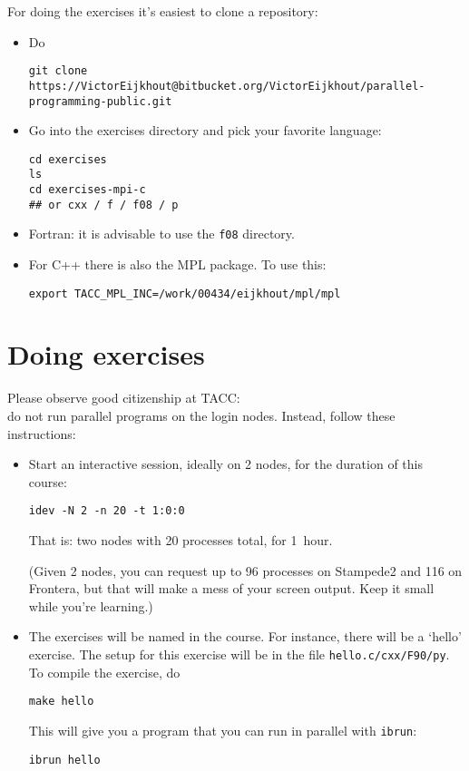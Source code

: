 \documentclass[11pt]{artikel3}
\begin{document}
For doing the exercises it's easiest to clone a repository:
\begin{itemize}
\item Do
\begin{verbatim}
git clone https://VictorEijkhout@bitbucket.org/VictorEijkhout/parallel-programming-public.git
\end{verbatim}
\item Go into the exercises directory and pick your favorite language:
\begin{verbatim}
cd exercises
ls
cd exercises-mpi-c
## or cxx / f / f08 / p
\end{verbatim}
\item Fortran: it is advisable to use the \texttt{f08} directory.
\item For C++ there is also the MPL package. To use this:
\begin{verbatim}
export TACC_MPL_INC=/work/00434/eijkhout/mpl/mpl
\end{verbatim}
\end{itemize}

\section{Doing exercises}

Please observe good citizenship at TACC:\\
do not run parallel programs on the login nodes. Instead,
follow these instructions:

\begin{itemize}
\item Start an interactive session, ideally on 2 nodes, for the
  duration of this course:
\begin{verbatim}
idev -N 2 -n 20 -t 1:0:0
\end{verbatim}
That is: two nodes with 20 processes total, for 1~hour.

(Given 2 nodes, you can request up to 96 processes on Stampede2
and 116 on Frontera, but that will make a mess of your screen output.
Keep it small while you're learning.)
\item The exercises will be named in the course. For instance, there
  will be a `hello' exercise. The setup for this exercise will be in
  the file \texttt{hello.c/cxx/F90/py}. To compile the exercise, do
\begin{verbatim}
make hello
\end{verbatim}
This will give you a program that you can run in parallel with \texttt{ibrun}:
\begin{verbatim}
ibrun hello
\end{verbatim}
\end{itemize}
\end{document}
